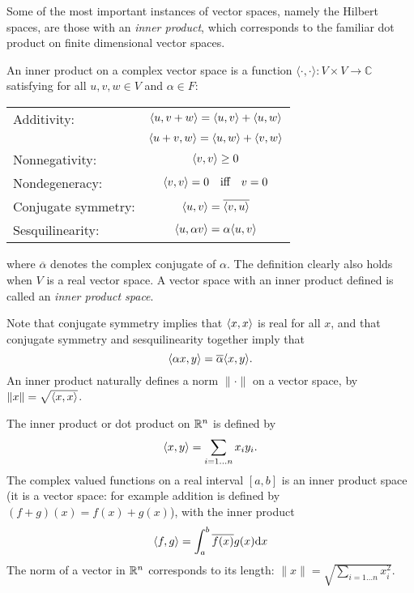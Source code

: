 \documentclass[12pt]{report}
\begin{document}
Some of the most important instances of vector spaces, namely the Hilbert spaces, are those with an \emph{inner product}, which corresponds to the familiar dot product on finite dimensional vector spaces.
\begin{defn}
An inner product on a complex vector space is a function $\langle \cdot ,\cdot \rangle : V \times V \rightarrow \mathbb{C}$ satisfying for all $u,v,w \in V$ and $\alpha \in F$:
\begin{center}
\begin{tabular}{lc}
Additivity: &
$\langle u, v+w \rangle  =  \langle u, v \rangle + \langle u, w \rangle$\\
\vspace{0.1cm}
&$\langle u+v, w \rangle  =  \langle u, w \rangle + \langle v, w \rangle$\\
\vspace{0.1cm}
Nonnegativity: &
$\langle v, v \rangle \ge 0$\\
\vspace{0.1cm}
Nondegeneracy: &
$\langle v, v \rangle = 0\quad \textrm{iff}\quad  v = 0$\\
\vspace{0.1cm}
Conjugate symmetry: &
$\langle u, v \rangle = \overline{\langle v, u \rangle}$\\
\vspace{0.1cm}
Sesquilinearity: &
$ \langle u, \alpha v \rangle = \alpha\langle u, v \rangle$
\end{tabular}
\end{center}
where $\overline{\alpha}$ denotes the complex conjugate of $\alpha$. The definition clearly also holds when $V$ is a real vector space. A vector space with an inner product defined is called an \emph{inner product space}.

Note that conjugate symmetry implies that $\langle x, x \rangle$ is real for all $x$, and that conjugate symmetry and sesquilinearity together imply that
$$\langle \alpha x, y \rangle = \overline{\alpha}\langle x, y \rangle.$$
An inner product naturally defines a norm $\|\cdot\|$ on a vector space, by $\|x\| = \sqrt{\langle x, x \rangle}$.
\end{defn}

\begin{example}
The inner product or dot product on $\mathbb{R}^n$ is defined by
$$\langle x, y \rangle  = \sum_{i = 1\ldots n} x_iy_i.$$
The complex valued functions on a real interval $[a,b]$ is an inner product space (it is a vector space: for example addition is defined by $(f + g)(x) = f(x) + g(x)$), with the inner product
$$\langle f, g \rangle = \int_a^b \overline{f(x)}g(x) \mathrm{d}x$$
The norm of a vector in $\mathbb{R}^n$ corresponds to its length: $\|x\| = \sqrt{\sum_{i=1\ldots n} x_i^2}$.
\end{example}
\end{document}
